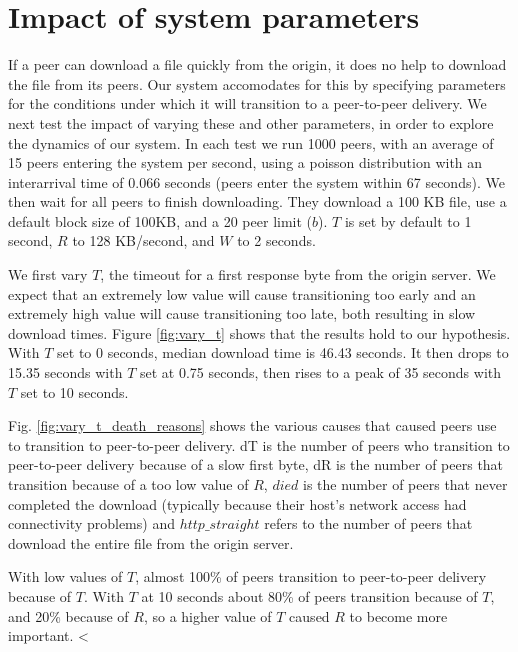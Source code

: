 \section{Impact of system parameters}

If a peer can download a file quickly from the origin, it does no help to download the file from its
peers. Our system accomodates for this by specifying parameters for the conditions under which it will 
transition to a peer-to-peer delivery. We next test the impact of varying these and other parameters, in order 
to explore the dynamics of our system. In each test we run 1000 peers, with an average of 15 peers entering 
the system per second, using a poisson distribution with an interarrival time of 0.066 seconds (peers enter the system within 67 seconds). 
We then wait for all peers to finish downloading. They download a 100 KB file, use a default block size of 100KB, and a 20 peer
limit ($b$). $T$ is set by default to 1 second, $R$ to 128 KB/second, and $W$ to 2 seconds. 

We first vary $T$, the timeout for a first response byte from the origin server. We expect that an extremely low value 
will cause transitioning too early and an extremely high value 
will cause transitioning too late, both resulting in slow download times. Figure \ref{fig:vary_t} shows that 
the results hold to our hypothesis. With $T$ set to 0 seconds, median download time is 46.43 seconds. It then drops to 15.35 seconds with $T$ set at 0.75 seconds, 
then rises to a peak of 35 seconds with $T$ set to 10 seconds.

Fig. \ref{fig:vary_t_death_reasons} shows the various causes that caused peers use to transition to peer-to-peer delivery.  dT is the number
of peers who transition to peer-to-peer delivery because of a slow first byte, dR is the number of
peers that transition because of a too low value of $R$, $died$ is the number of peers that never completed the download
(typically because their host's network access had connectivity problems) and $http\_straight$ refers to the number of peers
that download the entire file from the origin server.

With low values of $T$, almost 100\% of peers transition to peer-to-peer delivery because of $T$. With $T$ at 10 seconds
about 80\% of peers transition because of $T$, and 20\% because of $R$, so a higher value of $T$ caused $R$ to become more important.
<%


